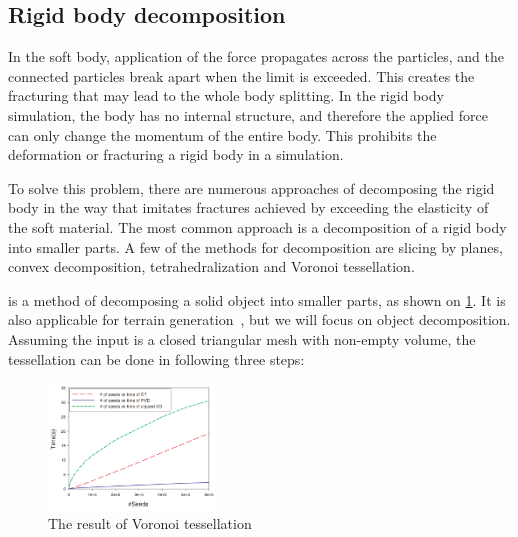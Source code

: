 \subsection{Rigid body decomposition}
In the soft body, application of the force propagates across the particles, and the connected particles break apart when the limit is exceeded. This creates the fracturing that may lead to the whole body splitting. In the rigid body simulation, the body has no internal structure, and therefore the applied force can only change the momentum of the entire body. This prohibits the deformation or fracturing a rigid body in a simulation.

To solve this problem, there are numerous approaches of decomposing the rigid body in the way that imitates fractures achieved by exceeding the elasticity of the soft material. The most common approach is a decomposition of a rigid body into smaller parts. A few  of the methods for decomposition are slicing by planes, convex decomposition, tetrahedralization and Voronoi tessellation.

 is a method of decomposing a solid object into smaller parts, as shown on \cref{fig:voro}. It is also applicable for \eg terrain generation~\cite{voronoiterrainrealtime}, but we will focus on object decomposition. Assuming the input is a closed triangular mesh with non-empty volume, the tessellation can be done in following three steps:

\begin{figure}
        \centering
        \includegraphics[width=0.4\textwidth]{img/clipped}
        \caption{The result of Voronoi tessellation \cite{yan2010efficient}}
        \label{fig:voro}
\end{figure}

